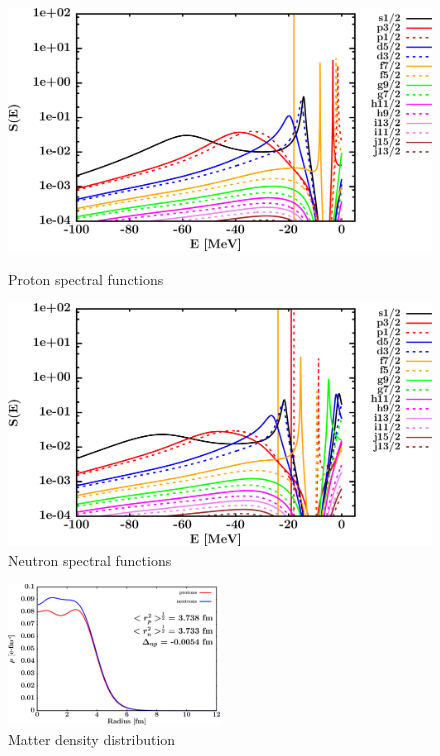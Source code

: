 \begin{figure}[H]
    \centering
    \begin{minipage}{0.45\textwidth}
        \centering
        \includegraphics[width=1.0\textwidth]{figures/ni58_protonSpectralFunctions.png}
        \caption{Proton spectral functions}
        \label{DOMFitData_ni58_proton_spectralFunctions}
    \end{minipage}\hfill
    \begin{minipage}{0.45\textwidth}
        \centering
        \includegraphics[width=1.0\textwidth]{figures/ni58_neutronSpectralFunctions.png}
        \caption{Neutron spectral functions}
        \label{DOMFitData_ni58_neutron_spectralFunctions}
    \end{minipage}
\end{figure}

\begin{figure}[H]
    \centering
    \includegraphics[width = 0.5\textwidth]{figures/ni58_matterDensity.png}
    \caption{Matter density distribution}
    \label{DOMFitData_ni58_matterDensity}
\end{figure}

